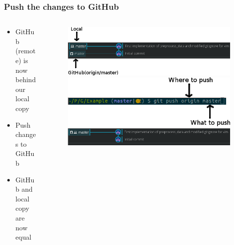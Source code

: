 \begin{frame}
	\frametitle{Push the changes to GitHub}
	\begin{columns}
		\begin{column}{0.4\textwidth}
			\begin{itemize}[<+->]
				\item GitHub (remote) is now behind our local copy
				\item Push changes to GitHub
				\item GitHub and local copy are now equal
			\end{itemize}
		\end{column}
		\begin{column}{0.6\textwidth}
			\begin{figure}
				\centering
				\begin{overprint}
					\includegraphics[width=\textwidth]{./pictures/first_commit.png}
					\onslide<2>\includegraphics[width=\textwidth]{./pictures/git_push_master.png}
					\onslide<3>\includegraphics[width=\textwidth]{./pictures/synced.png}
				\end{overprint}
			\end{figure}
		\end{column}
	\end{columns}
\end{frame}

		
